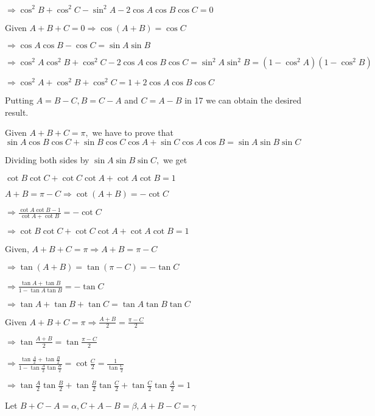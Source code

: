   $\Rightarrow \cos^2B + \cos^2C - \sin^2A - 2\cos A\cos B\cos C = 0$

\item Given $A + B + C = 0 \Rightarrow \cos(A + B) = \cos C$

  $\Rightarrow \cos A\cos B - \cos C = \sin A\sin B$

  $\Rightarrow \cos^2A\cos^2B + \cos^2C - 2\cos A\cos B\cos C = \sin^2A\sin^2B = (1 - \cos^2A)(1 - \cos^2B)$

  $\Rightarrow \cos^2A + \cos^2B + \cos^2C = 1 + 2\cos A\cos B\cos C$

\item Putting $A = B - C, B = C - A$ and $C = A - B$ in 17 we can obtain the desired result.

\item Given $A + B + C = \pi,$ we have to prove that $\sin A\cos B\cos C + \sin B\cos C\cos A + \sin C\cos A\cos B= \sin
  A\sin B\sin C$

  Dividing both sides by $\sin A\sin B\sin C,$ we get

  $\cot B\cot C + \cot C\cot A + \cot A\cot B = 1$

  $A + B = \pi - C\Rightarrow \cot(A + B) = -\cot C$

  $\Rightarrow \frac{\cot A\cot B - 1}{\cot A + \cot B} = -\cot C$

  $\Rightarrow \cot B\cot C + \cot C\cot A + \cot A\cot B = 1$

\item Given, $A + B + C = \pi \Rightarrow A + B = \pi - C$

  $\Rightarrow \tan(A + B) = \tan(\pi - C) = -\tan C$

  $\Rightarrow \frac{\tan A + \tan B}{1 - \tan A\tan B} = -\tan C$

  $\Rightarrow \tan A + \tan B + \tan C = \tan A\tan B\tan C$

\item Given $A + B + C = \pi \Rightarrow \frac{A + B}{2} = \frac{\pi - C}{2}$

  $\Rightarrow \tan\frac{A + B}{2} = \tan\frac{\pi - C}{2}$

  $\Rightarrow \frac{\tan\frac{A}{2} + \tan\frac{B}{2}}{1 - \tan\frac{A}{2}\tan\frac{B}{2}} = \cot\frac{C}{2} =
  \frac{1}{\tan\frac{C}{2}}$

  $\Rightarrow \tan\frac{A}{2}\tan\frac{B}{2} + \tan\frac{B}{2}\tan\frac{C}{2} + \tan\frac{C}{2}\tan\frac{A}{2} = 1$

\item Let $B + C - A = \alpha, C + A - B = \beta, A + B - C = \gamma$

